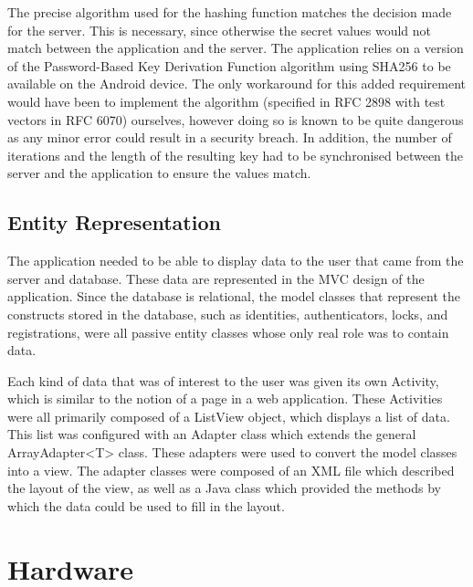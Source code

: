 \documentclass[12pt]{report}
\let\Oldsection\section
\renewcommand{\section}{\FloatBarrier\Oldsection}
\let\Oldsubsection\subsection
\renewcommand{\subsection}{\FloatBarrier\Oldsubsection}
\begin{document}
The precise algorithm used for the hashing function matches the decision made for the server. This is necessary, since
otherwise the secret values would not match between the application and the server. The application relies on a version
of the Password-Based Key Derivation Function algorithm using SHA256 to be available on the Android device. The only
workaround for this added requirement would have been to implement the algorithm (specified in RFC 2898 with test
vectors in RFC 6070) ourselves, however doing so is known to be quite dangerous as any minor error could result in a
security breach. In addition, the number of iterations and the length of the resulting key had to be synchronised
between the server and the application to ensure the values match.


\subsection{Entity Representation} \label{entity-representation}

The application needed to be able to display data to the user that came from the server and database. These data are
represented in the MVC design of the application. Since the database is relational, the model classes that represent
the constructs stored in the database, such as identities, authenticators, locks, and registrations, were all passive
entity classes whose only real role was to contain data.

Each kind of data that was of interest to the user was given its own Activity, which is similar to the notion of a page
in a web application. These Activities were all primarily composed of a ListView object, which displays a list of data.
This list was configured with an Adapter class which extends the general ArrayAdapter<T> class. These adapters were
used to convert the model classes into a view. The adapter classes were composed of an XML file which described the
layout of the view, as well as a Java class which provided the methods by which the data could be used to fill in the
layout.


\section{Hardware} \label{hardware}
\end{document}
